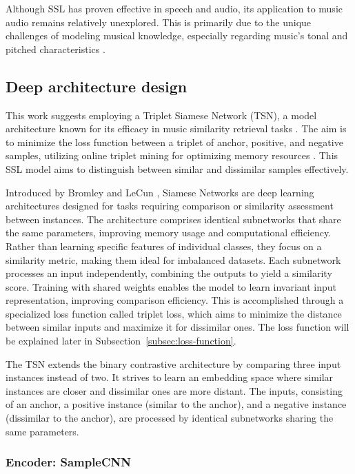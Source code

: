 Although SSL has proven effective in speech and audio, its application to music audio remains relatively unexplored. This is primarily due to the unique challenges of modeling musical knowledge, especially regarding music's tonal and pitched characteristics \cite{Li2023MERT:Training}.

\subsection{Deep architecture design}

This work suggests employing a Triplet Siamese Network (TSN), a model architecture known for its efficacy in music similarity retrieval tasks \cite{contentmusicsimtriplet2020}. The aim is to minimize the loss function between a triplet of anchor, positive, and negative samples, utilizing online triplet mining for optimizing memory resources \cite{Sikaroudi2020OfflinePatches}. This SSL model aims to distinguish between similar and dissimilar samples effectively.

Introduced by Bromley and LeCun \cite{Bromley1993SignatureNetwork}, Siamese Networks are deep learning architectures designed for tasks requiring comparison or similarity assessment between instances. The architecture comprises identical subnetworks that share the same parameters, improving memory usage and computational efficiency. Rather than learning specific features of individual classes, they focus on a similarity metric, making them ideal for imbalanced datasets. Each subnetwork processes an input independently, combining the outputs to yield a similarity score. Training with shared weights enables the model to learn invariant input representation, improving comparison efficiency. This is accomplished through a specialized loss function called triplet loss, which aims to minimize the distance between similar inputs and maximize it for dissimilar ones. The loss function will be explained later in Subsection~\ref{subsec:loss-function}.

The TSN extends the binary contrastive architecture by comparing three input instances instead of two. It strives to learn an embedding space where similar instances are closer and dissimilar ones are more distant. The inputs, consisting of an anchor, a positive instance (similar to the anchor), and a negative instance (dissimilar to the anchor), are processed by identical subnetworks sharing the same parameters.

\subsubsection{Encoder: SampleCNN}

